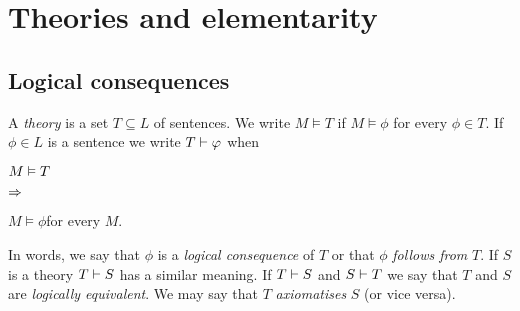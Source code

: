 \documentclass[creche.tex]{subfiles}
\begin{document}
\chapter{Theories and elementarity}
\label{teorie}

\def\medrel#1{\parbox[t]{6ex}{$\displaystyle\hfil #1$}}
\def\ceq#1#2#3{\parbox{15ex}{$\displaystyle #1$}\medrel{#2}$\displaystyle  #3$}

\section{Logical consequences}\label{conseguenzelogiche}
% 
% 
% 
% 
% 
% 


A \emph{theory\/} is a set $T\subseteq L$ of sentences. We write \emph{$M\models T$\/} if $M\models\phi$ for every $\phi\in T$. If $\phi\in L$ is a sentence we write \emph{$T\vdash\varphi$\/} when

\ceq{\hfill M\models T}{\IMP}{M\models\phi}\qquad for every $M$.

In words, we say that $\phi$ is a \emph{logical consequence\/} of $T$ or that $\phi$ \emph{follows from\/} $T$. If $S$ is a theory \emph{$T\vdash S$\/} has a similar meaning. If $T\vdash S$ and $S\vdash T$ we say that $T$ and $S$ are \emph{logically equivalent}.  We may say that $T$ \emph{axiomatises\/} $S$ (or vice versa).
\end{document}
